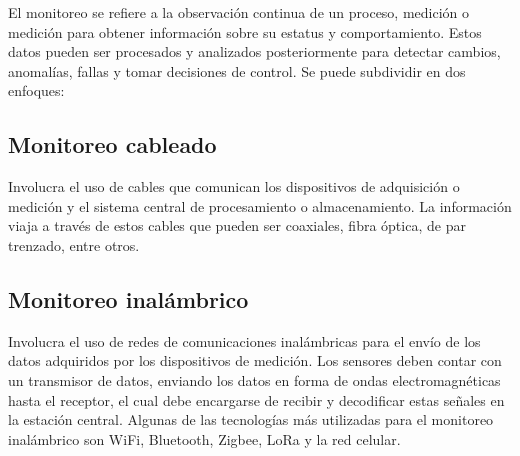 El monitoreo se refiere a la observación continua de un proceso, medición o medición para obtener información sobre su estatus y comportamiento. Estos datos pueden ser procesados y analizados posteriormente para detectar cambios, anomalías, fallas y tomar decisiones de control. Se puede subdividir en dos enfoques:

\subsection{Monitoreo cableado} Involucra el uso de cables que comunican los dispositivos de adquisición o medición y el sistema central de procesamiento o almacenamiento. La información viaja a través de estos cables que pueden ser coaxiales, fibra óptica, de par trenzado, entre otros. 

\subsection{Monitoreo inalámbrico} Involucra el uso de redes de comunicaciones inalámbricas para el envío de los datos adquiridos por los dispositivos de medición. Los sensores deben contar con un transmisor de datos, enviando los datos en forma de ondas electromagnéticas hasta el receptor, el cual debe encargarse de recibir y decodificar estas señales en la estación central. Algunas de las tecnologías más utilizadas para el monitoreo inalámbrico son WiFi, Bluetooth, Zigbee, LoRa y la red celular. 


